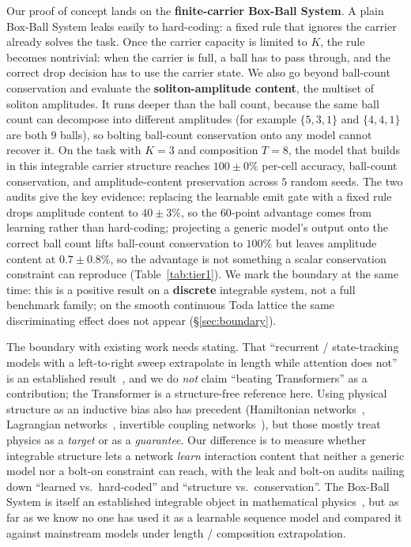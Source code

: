 \documentclass[11pt]{article}
\theoremstyle{definition}
\theoremstyle{plain}
\begin{document}
Our proof of concept lands on the \textbf{finite-carrier Box-Ball System}. A plain Box-Ball
System leaks easily to hard-coding: a fixed rule that ignores the carrier already solves the
task. Once the carrier capacity is limited to $K$, the rule becomes nontrivial: when the
carrier is full, a ball has to pass through, and the correct drop decision has to use the
carrier state. We also go beyond ball-count conservation and evaluate the \textbf{soliton-amplitude
content}, the multiset of soliton amplitudes. It runs deeper than the ball count, because the
same ball count can decompose into different amplitudes (for example $\{5,3,1\}$ and $\{4,4,1\}$
are both $9$ balls), so bolting ball-count conservation onto any model cannot recover it. On the
task with $K=3$ and composition $T=8$, the model that builds in this integrable carrier structure
reaches $100\pm0\%$ per-cell accuracy, ball-count conservation, and amplitude-content preservation
across $5$ random seeds. The two audits give the key evidence: replacing the learnable emit gate
with a fixed rule drops amplitude content to $40\pm3\%$, so the $60$-point advantage comes from
learning rather than hard-coding; projecting a generic model's output onto the correct ball count
lifts ball-count conservation to $100\%$ but leaves amplitude content at $0.7\pm0.8\%$, so the
advantage is not something a scalar conservation constraint can reproduce (Table~\ref{tab:tier1}).
We mark the boundary at the same time: this is a positive result on a \textbf{discrete} integrable
system, not a full benchmark family; on the smooth continuous Toda lattice the same discriminating
effect does not appear (\S\ref{sec:boundary}).

The boundary with existing work needs stating. That ``recurrent / state-tracking models with a
left-to-right sweep extrapolate in length while attention does not'' is an established
result~\citep{liu2023transformers, merrill2023parallelism, merrill2024illusion}, and we do
\emph{not} claim ``beating Transformers'' as a contribution; the Transformer is a structure-free
reference here. Using physical structure as an inductive bias also has precedent (Hamiltonian
networks~\citep{greydanus2019hamiltonian}, Lagrangian networks~\citep{cranmer2020lagrangian},
invertible coupling networks~\citep{dinh2014nice, dinh2016density}), but those mostly treat
physics as a \emph{target} or as a \emph{guarantee}. Our difference is to measure whether
integrable structure lets a network \emph{learn} interaction content that neither a generic
model nor a bolt-on constraint can reach, with the leak and bolt-on audits nailing down ``learned
vs.\ hard-coded'' and ``structure vs.\ conservation''. The Box-Ball System is itself an
established integrable object in mathematical physics~\citep{takahashi1990soliton}, but as far as
we know no one has used it as a learnable sequence model and compared it against mainstream models
under length / composition extrapolation.
\end{document}
